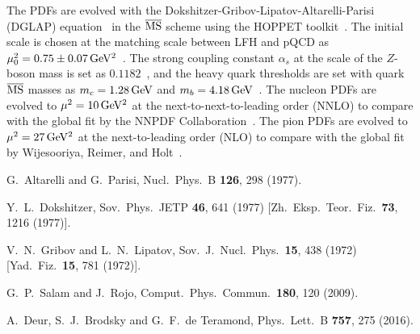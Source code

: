 The PDFs are evolved with the Dokshitzer-Gribov-Lipatov-Altarelli-Parisi (DGLAP) equation~\cite{Altarelli:1977zs,Dokshitzer:1977sg,Gribov:1972ri} in the $\overline{\rm MS}$ scheme using the HOPPET toolkit~\cite{Salam:2008qg}. The initial scale is chosen at the matching scale between LFH and pQCD as $\mu_0^2=0.75\pm0.07\,\rm GeV^2$~\cite{Deur:2016cxb}. The strong coupling constant $\alpha_s$ at the scale of the $Z$-boson mass is set as $0.1182$~\cite{Patrignani:2016xqp}, and the heavy quark thresholds are set with quark $\overline{\rm MS}$ masses as $m_c=1.28\,\rm GeV$ and $m_b=4.18\,\rm GeV$~\cite{Patrignani:2016xqp}. The nucleon PDFs are evolved to $\mu^2=10\,\rm GeV^2$ at the next-to-next-to-leading order (NNLO) to compare with the global fit by the NNPDF Collaboration~\cite{Ball:2014uwa}. The pion PDFs are evolved to $\mu^2=27\,\rm GeV^2$ at the next-to-leading order (NLO) to compare with the global fit by Wijesooriya, Reimer, and Holt~\cite{Wijesooriya:2005ir}.








  G.~Altarelli and G.~Parisi,
  Nucl.\ Phys.\ B {\bf 126}, 298 (1977).

  Y.~L.~Dokshitzer,
  Sov.\ Phys.\ JETP {\bf 46}, 641 (1977)
  [Zh.\ Eksp.\ Teor.\ Fiz.\  {\bf 73}, 1216 (1977)].

  V.~N.~Gribov and L.~N.~Lipatov,
  Sov.\ J.\ Nucl.\ Phys.\  {\bf 15}, 438 (1972)
  [Yad.\ Fiz.\  {\bf 15}, 781 (1972)].

  G.~P.~Salam and J.~Rojo,
  Comput.\ Phys.\ Commun.\  {\bf 180}, 120 (2009).

  A.~Deur, S.~J.~Brodsky and G.~F.~de Teramond,
  Phys.\ Lett.\ B {\bf 757}, 275 (2016).

